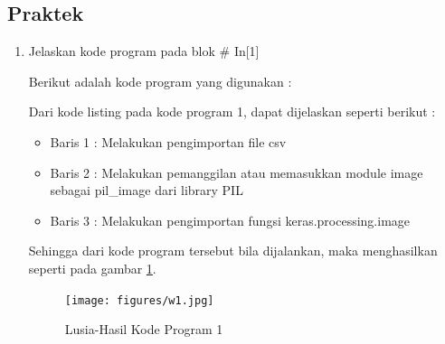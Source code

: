 \subsection{Praktek}
\begin{enumerate}
\item Jelaskan kode program pada blok \# In[1]
	\par Berikut adalah kode program yang digunakan :
	
	\par Dari kode listing pada kode program 1, dapat dijelaskan seperti berikut :
	\begin{itemize}
	\item Baris 1	: Melakukan pengimportan file csv
	\item Baris 2	: Melakukan pemanggilan atau memasukkan module image sebagai pil\_image dari library PIL
	\item Baris 3	: Melakukan pengimportan fungsi keras.processing.image 
	\end{itemize}
	\par Sehingga dari kode program tersebut bila dijalankan, maka menghasilkan seperti pada gambar \ref{7B1}.
		\begin{figure}[!hbtp]
		\centering
		\texttt{[image: figures/w1.jpg]}
		\caption{Lusia-Hasil Kode Program 1}
		\label{7B1}
		\end{figure}
	

\end{enumerate}
